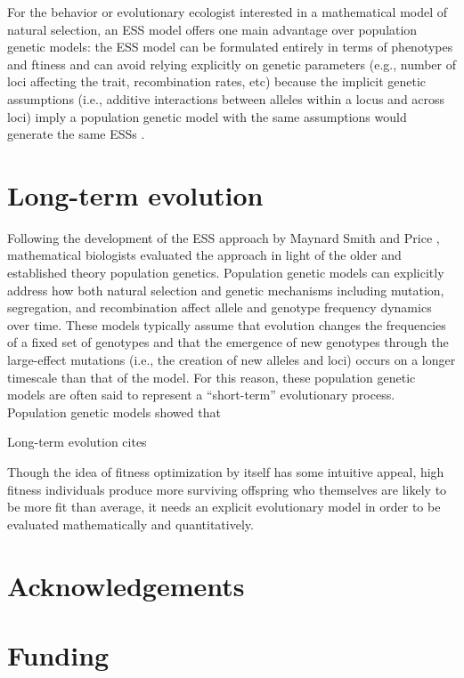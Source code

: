 \documentclass[11pt]{article}
\begin{document}
For the behavior or evolutionary ecologist interested in a mathematical model of natural selection, an ESS model offers one main advantage over population genetic models: the ESS model can be formulated entirely in terms of phenotypes and ftiness and can avoid relying explicitly on genetic parameters (e.g., number of loci affecting the trait, recombination rates, etc) because the implicit genetic assumptions (i.e., additive interactions between alleles within a locus and across loci) imply a population genetic model with the same assumptions would generate the same ESSs \cite{Eshel:1982}.



\section{Long-term evolution}

Following the development of the ESS approach by Maynard Smith and Price \cite{Maynard-Smith:Price:1973}, mathematical biologists evaluated the approach in light of the older and established theory population genetics. Population genetic models can explicitly address how both natural selection and genetic mechanisms including mutation, segregation, and recombination affect allele and genotype frequency dynamics over time. These models typically assume that evolution changes the frequencies of a fixed set of genotypes and that the emergence of new genotypes through the large-effect mutations (i.e., the creation of new alleles and loci) occurs on a longer timescale than that of the model. For this reason, these population genetic models are often said to represent a ``short-term'' evolutionary process. Population genetic models showed that \cite{Cavalli-Sforza:Feldman:1978,Eshel:1982}



Long-term evolution cites \cite{Eshel:1996,Hammerstein:1996,Weissing:1996}






Though the idea of fitness optimization by itself has some intuitive appeal, high fitness individuals produce more surviving offspring who themselves are likely to be more fit than average, it needs an explicit evolutionary model in order to be evaluated mathematically and quantitatively.




\section{Acknowledgements}

\section{Funding}

\clearpage
\printbibliography
\end{document}
